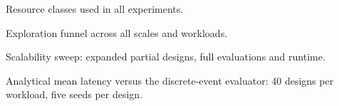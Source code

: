 \documentclass[preprint,11pt,3p]{elsarticle}
\theoremstyle{plain}
\theoremstyle{definition}
\begin{document}
\begin{table}[!htbp]\centering
\caption{Resource classes used in all experiments.}

\end{table}
\clearpage

\begin{table}[!htbp]\centering
\caption{Exploration funnel across all scales and workloads.}

\end{table}

\begin{table}[!htbp]\centering
\caption{Scalability sweep: expanded partial designs, full evaluations and runtime.}

\end{table}

\begin{table}[!htbp]\centering
\caption{Analytical mean latency versus the discrete-event evaluator: 40 designs per
workload, five seeds per design.}

\end{table}
\end{document}
